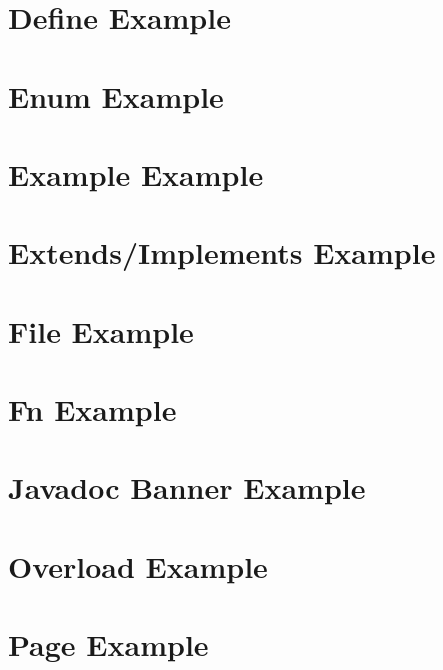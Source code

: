 \documentclass{book}
\newcommand{\+}{\discretionary{\mbox{\scriptsize$\hookleftarrow$}}{}{}}
\begin{document}
\chapter{Define Example}\label{define_example}\hypertarget{define_example}{}
\chapter{Enum Example}\label{enum_example}\hypertarget{enum_example}{}
\chapter{Example Example}\label{example_example}\hypertarget{example_example}{}
\chapter{Extends/Implements Example}\label{extends_example}\hypertarget{extends_example}{}
\chapter{File Example}\label{file_example}\hypertarget{file_example}{}
\chapter{Fn Example}\label{fn_example}\hypertarget{fn_example}{}
\chapter{Javadoc Banner Example}\label{javadoc_banner_example}\hypertarget{javadoc_banner_example}{}
\chapter{Overload Example}\label{overload_example}\hypertarget{overload_example}{}
\chapter{Page Example}\label{page_example}\hypertarget{page_example}{}
\end{document}
